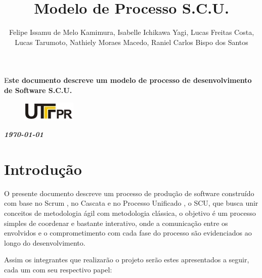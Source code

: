 \documentclass[	DIV=calc,%
							paper=a4,%
							fontsize=12pt,%
							onecolumn]{scrartcl}%
\title{Modelo de Processo S.C.U. }					%
\author{Felipe Issamu de Melo Kamimura, Isabelle Ichikawa Yagi, Lucas Freitas Costa, Lucas Tarumoto, Nathiely Moraes Macedo, Raniel Carlos Bispo dos Santos }  	%
\date{}																				%
\newcommand{\initial}[1]{%
     \lettrine[lines=3,lhang=0.3,nindent=0em]{
     				\color{DarkGoldenrod}
     				{\textsf{#1}}}{}}
\begin{document}
\maketitle
\thispagestyle{fancy} 	
\thispagestyle{empty}		%




\initial{E}\textbf{ste documento descreve um modelo de processo de desenvolvimento de Software S.C.U.}

\begin{figure}
	\centering
	\includegraphics{utfpr}
\end{figure}

\vspace{3cm}
\centerline{\textit{\textbf{\today}}}

\clearpage
    \renewcommand*\listfigurename{Lista de figuras}
\listoffigures

\renewcommand*\listtablename{Lista de tabelas}
\listoftables




\clearpage
\renewcommand{\contentsname}{Sumário}
\tableofcontents
\clearpage

\section{Introdução}
O presente documento descreve um processo de produção de software construído com base no Scrum \cite{sutherland2014scrum}, no Cascata \cite{sommervilleengenharia} e no Processo Unificado \cite{scott2003processo}, o SCU, que busca unir conceitos de metodologia ágil com metodologia clássica, o objetivo é um processo simples de coordenar e bastante interativo, onde a comunicação entre os envolvidos e o comprometimento com cada fase do processo são evidenciados ao longo do desenvolvimento.	

Assim os integrantes que realizarão o projeto serão estes apresentados a seguir, cada um com seu respectivo papel:
\end{document}
